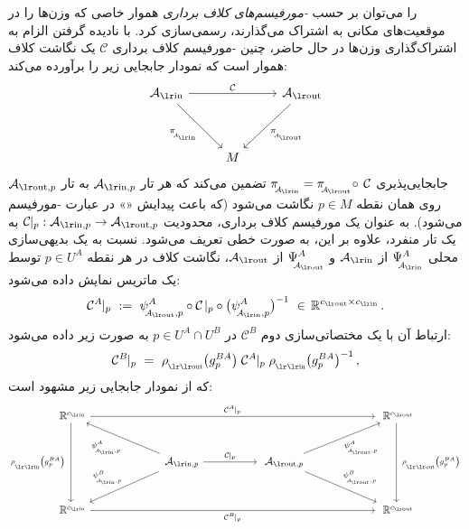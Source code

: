 \onexoneGMsfarsi را می‌توان بر حسب \emph{-مورفیسم‌های کلاف برداری} هموار خاصی که وزن‌ها را در موقعیت‌های مکانی به اشتراک می‌گذارند، رسمی‌سازی کرد.
با نادیده گرفتن الزام به اشتراک‌گذاری وزن‌ها در حال حاضر، چنین -مورفیسم کلاف برداری $\mathcal{C}$ یک نگاشت کلاف هموار است که نمودار جابجایی زیر را برآورده می‌کند:
\begin{equation}\label{eq:bundle_morphism_onexone}
    \begin{tikzcd}[row sep=3.5em, column sep=2.5em]
        \Ain
            \arrow[rd, "\piAin"']
            \arrow[rr, "\mathcal{C}"]
        & &
        \Aout
            \arrow[ld, "\piAout"]
        \\
        & M
    \end{tikzcd}
\end{equation}
جابجایی‌پذیری $\piAin = \piAout \!\circ\, \mathcal{C}$ تضمین می‌کند که هر تار $\Ainp$ به تار $\Aoutp$ روی همان نقطه $p\in M$ نگاشت می‌شود (که باعث پیدایش «» در عبارت -مورفیسم می‌شود).
به عنوان یک مورفیسم کلاف برداری، محدودیت $\mathcal{C}\!\!\;|_p: \Ainp\to\Aoutp$ به یک تار منفرد، علاوه بر این، به صورت خطی تعریف می‌شود.
نسبت به یک بدیهی‌سازی محلی $\PsiAin^A$ از $\Ain$ و $\PsiAout^A$ از $\Aout$، نگاشت کلاف در هر نقطه $p\in U^A$ توسط یک ماتریس نمایش داده می‌شود:
\begin{align}\label{eq:bundle_morphism_onexone_triv_local}
    \mathcal{C}^A\!\!\;|_p\ :=\  \psiAoutp^A \circ \mathcal{C}\!\;|_p \circ \big(\psiAinp^A\big)^{-1}\ \in\, \R^{\cout\times\cin} \,.
\end{align}
ارتباط آن با یک مختصاتی‌سازی دوم $\mathcal{C}^B$ در $p\in U^A\cap U^B$ به صورت زیر داده می‌شود:
\begin{align}\label{eq:onexone_gaugetrafo}
    \mathcal{C}^B\!\!\;|_p \ =\ \rhoout\big(g_p^{BA}\big)\; \mathcal{C}^A\!\!\;|_p\; \rhoin\big(g_p^{BA}\big)^{-1} \,,
\end{align}
که از نمودار جابجایی زیر مشهود است:
\begin{equation}
\begin{tikzcd}[column sep=65pt, row sep=30, font=\normalsize]
    \R^{\cin}
        \arrow[dd, "\rhoin\big(g_p^{BA}\big)\ "']
        \arrow[rrr, "\mathcal{C}^A\!\!\;|_p"]
    & &[-3ex] &
    \R^{\cout}
        \arrow[dd, "\ \rhoout\big(g_p^{BA}\big)"]
    \\
    &
    \Ainp
        \arrow[r, "\mathcal{C}\!\!\;|_p"]
        \arrow[ul, "\psiAinp^A"]
        \arrow[dl, "\psiAinp^B"']
    &
    \Aoutp
        \arrow[ur, "\psiAoutp^A"']
        \arrow[dr, "\psiAoutp^B"]
    \\
    \R^{\cin}
        \arrow[rrr, "\mathcal{C}^B\!\!\;|_p"']
    & & &
    \R^{\cout}
\end{tikzcd}
\end{equation}


